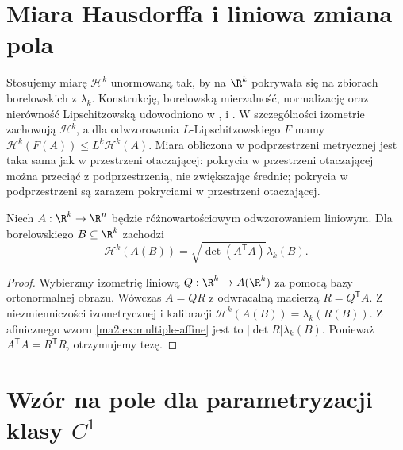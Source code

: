 \section{Miara Hausdorffa i liniowa zmiana pola}

Stosujemy miarę $\mathcal H^k$ unormowaną tak, by
na $\R^k$ pokrywała się na zbiorach borelowskich
z $\lambda_k$. Konstrukcję, borelowską mierzalność,
normalizację oraz nierówność Lipschitzowską
udowodniono w
,
i .
W szczególności izometrie zachowują $\mathcal H^k$,
a dla odwzorowania $L$-Lipschitzowskiego $F$
mamy $\mathcal H^k(F(A))\le L^k\mathcal H^k(A)$.
Miara obliczona w podprzestrzeni metrycznej jest
taka sama jak w przestrzeni otaczającej: pokrycia
w przestrzeni otaczającej można przeciąć z podprzestrzenią,
nie zwiększając średnic; pokrycia w podprzestrzeni
są zarazem pokryciami w przestrzeni otaczającej.

\begin{lemat}
\label{ma2:lem:surface-linear-area}
Niech $A:\R^k\to\R^n$ będzie różnowartościowym
odwzorowaniem liniowym. Dla borelowskiego
$B\subseteq\R^k$ zachodzi
\[
 \mathcal H^k(A(B))=\sqrt{\det(A^{\mathsf T}A)}\lambda_k(B).
\]
\end{lemat}
\begin{proof}
Wybierzmy izometrię liniową $Q:\R^k\to A(\R^k)$
za pomocą bazy ortonormalnej obrazu.
Wówczas $A=QR$ z odwracalną macierzą $R=Q^{\mathsf T}A$.
Z niezmienniczości izometrycznej i kalibracji
$\mathcal H^k(A(B))=\lambda_k(R(B))$.
Z afinicznego wzoru \ref{ma2:ex:multiple-affine}
jest to $|\det R|\lambda_k(B)$.
Ponieważ $A^{\mathsf T}A=R^{\mathsf T}R$, otrzymujemy tezę.
\end{proof}

\section{Wzór na pole dla parametryzacji klasy \texorpdfstring{$C^1$}{C\textasciicircum 1}}

